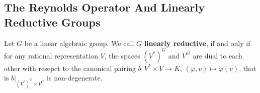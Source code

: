 
\subsection{The Reynolds Operator And Linearly Reductive Groups}

\begin{definition}
  Let $G$ be a linear algebraic group.
  We call $G$ \textbf{linearly reductive}, if and only if for any rational representation $V$, the spaces $(V^\ast)^G$ and $V^G$ are dual to each other with resepct to the canonical pairing $b \colon V^\ast \times V \rightarrow K$, $(\varphi,v) \mapsto \varphi(v)$, that is $\left. b \right|_{(V^\ast)^G \times V^G}$ is non-degenerate.
\end{definition}



